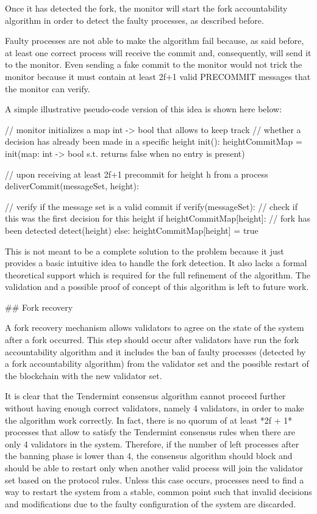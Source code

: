 \documentclass[a4paper,11pt,oneside]{report}
\begin{document}
\begin{markdown}
Once it has detected the fork, the monitor will start the fork accountability algorithm in order to detect the faulty processes, as described before.

Faulty processes are not able to make the algorithm fail because, as said before, at least one correct process will receive the commit and, consequently, will send it to the monitor. Even sending a fake commit to the monitor would not trick the monitor because it must contain at least 2f+1 valid PRECOMMIT messages that the monitor can verify.

A simple illustrative pseudo-code version of this idea is shown here below:


    // monitor initializes a map int -> bool that allows to keep track
    // whether a decision has already been made in a specific height
    init():
	    heightCommitMap = init(map: int -> bool s.t. returns false when no entry is present)

    // upon receiving at least 2f+1 precommit for height h from a process 
    deliverCommit(messageSet, height):
   
        // verify if the message set is a valid commit
	    if verify(messageSet):
		    // check if this was the first decision for this height
		    if heightCommitMap[height]:
			    // fork has been detected
			    detect(height)
		    else:
			    heightCommitMap[height] = true

This is not meant to be a complete solution to the problem because it just provides a basic intuitive idea to handle the fork detection. It also lacks a formal theoretical support which is required for the full refinement of the algorithm.
The validation and a possible proof of concept of this algorithm is left to future work.

## Fork recovery

A fork recovery mechanism allows validators to agree on the state of the system after a fork occurred. 
This step should occur after validators have run the fork accountability algorithm and it includes the ban of faulty processes (detected by a fork accountability algorithm) from the validator set and the possible restart of the blockchain with the new validator set.

It is clear that the Tendermint consensus algorithm cannot proceed further without having enough correct validators, namely 4 validators, in order to make the algorithm work correctly. In fact, there is no quorum of at least *2f + 1* processes that allow to satisfy the Tendermint consensus rules when there are only 4 validators in the system. 
Therefore, if the number of left processes after the banning phase is lower than 4, the consensus algorithm should block and should be able to restart only when another valid process will join the validator set based on the protocol rules.
Unless this case occurs, processes need to find a way to restart the system from a stable, common point such that invalid decisions and modifications due to the faulty configuration of the system are discarded.


\end{markdown}
\end{document}
